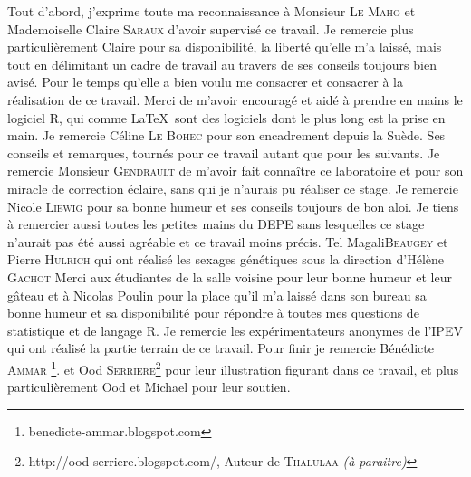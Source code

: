 Tout d'abord, j'exprime toute ma reconnaissance à Monsieur \textsc{Le Maho }et Mademoiselle Claire\textsc{ Saraux }d'avoir supervisé ce travail.
\vfill
Je remercie plus particulièrement Claire pour sa disponibilité, la liberté qu'elle m'a laissé, mais tout en délimitant un cadre de travail au travers de ses conseils toujours bien avisé. Pour le temps qu'elle a bien voulu me consacrer et consacrer à la réalisation de ce travail.
Merci de m'avoir encouragé et aidé à prendre en mains le logiciel R, qui comme \LaTeX ~sont des logiciels dont le plus long est la prise en main.
\vfill
Je remercie Céline \textsc{Le Bohec} pour son encadrement depuis la Suède. Ses conseils et remarques,  tournés pour ce travail autant que pour les suivants.
\vfill
Je remercie Monsieur \textsc{Gendrault} de m'avoir fait connaître ce laboratoire et pour son miracle de correction éclaire, sans qui je n'aurais pu réaliser ce stage.
\vfill
Je remercie Nicole \textsc{Liewig} pour sa bonne humeur et ses conseils toujours de bon aloi.
\vfill
Je tiens à remercier aussi toutes les petites mains du DEPE sans lesquelles ce stage n'aurait pas été aussi agréable et ce travail moins précis.
Tel Magali\textsc{Beaugey} et Pierre \textsc{Hulrich} qui ont réalisé les sexages génétiques sous la direction d'Hélène \textsc{Gachot}
\vfill
Merci aux étudiantes de la salle voisine pour leur bonne humeur et leur gâteau et à Nicolas Poulin pour la place qu'il m'a laissé dans son bureau sa bonne humeur et sa disponibilité pour répondre à toutes mes questions de statistique et de langage R.
\vfill
Je remercie les expérimentateurs anonymes de l'IPEV qui ont réalisé la partie terrain de ce travail.
\vfill
Pour finir je remercie Bénédicte \textsc{Ammar} \footnote{benedicte-ammar.blogspot.com}. et Ood \textsc{Serriere}\footnote{http://ood-serriere.blogspot.com/, Auteur de \textsc{Thalulaa} \emph{(à paraitre)}} pour leur illustration figurant dans ce travail, et plus particulièrement Ood et Michael pour leur soutien.